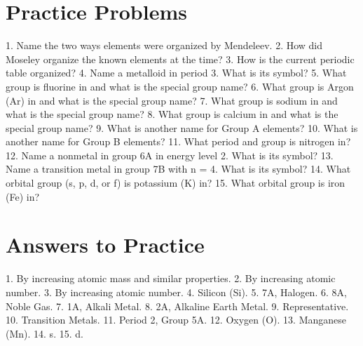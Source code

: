 \documentclass{article}
\begin{document}
\section*{Practice Problems}
1. Name the two ways elements were organized by Mendeleev.
2. How did Moseley organize the known elements at the time?
3. How is the current periodic table organized?
4. Name a metalloid in period 3. What is its symbol?
5. What group is fluorine in and what is the special group name?
6. What group is Argon (Ar) in and what is the special group name?
7. What group is sodium in and what is the special group name?
8. What group is calcium in and what is the special group name?
9. What is another name for Group A elements?
10. What is another name for Group B elements?
11. What period and group is nitrogen in?
12. Name a nonmetal in group 6A in energy level 2. What is its symbol?
13. Name a transition metal in group 7B with n = 4. What is its symbol?
14. What orbital group (s, p, d, or f) is potassium (K) in?
15. What orbital group is iron (Fe) in?

\section*{Answers to Practice}
1. By increasing atomic mass and similar properties.
2. By increasing atomic number.
3. By increasing atomic number.
4. Silicon (Si).
5. 7A, Halogen.
6. 8A, Noble Gas.
7. 1A, Alkali Metal.
8. 2A, Alkaline Earth Metal.
9. Representative.
10. Transition Metals.
11. Period 2, Group 5A.
12. Oxygen (O).
13. Manganese (Mn).
14. s.
15. d.
\end{document}
